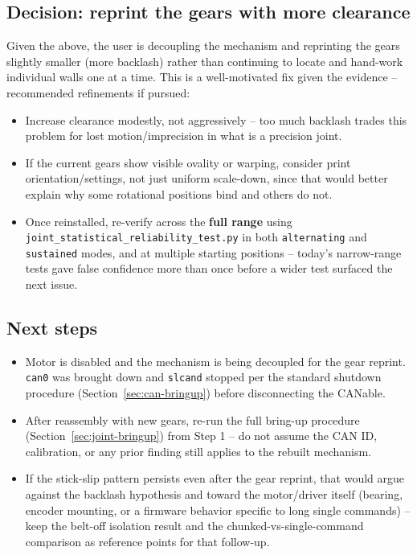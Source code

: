 \documentclass[11pt,letterpaper]{article}
\begin{document}
\subsection{Decision: reprint the gears with more clearance}
Given the above, the user is decoupling the mechanism and reprinting the gears slightly smaller (more backlash) rather than continuing to locate and hand-work individual walls one at a time. This is a well-motivated fix given the evidence -- recommended refinements if pursued:
\begin{itemize}
    \item Increase clearance modestly, not aggressively -- too much backlash trades this problem for lost motion/imprecision in what is a precision joint.
    \item If the current gears show visible ovality or warping, consider print orientation/settings, not just uniform scale-down, since that would better explain why some rotational positions bind and others do not.
    \item Once reinstalled, re-verify across the \textbf{full range} using \texttt{joint\_statistical\_reliability\_test.py} in both \texttt{alternating} and \texttt{sustained} modes, and at multiple starting positions -- today's narrow-range tests gave false confidence more than once before a wider test surfaced the next issue.
\end{itemize}

\subsection{Next steps}
\begin{itemize}
    \item Motor is disabled and the mechanism is being decoupled for the gear reprint. \texttt{can0} was brought down and \texttt{slcand} stopped per the standard shutdown procedure (Section~\ref{sec:can-bringup}) before disconnecting the CANable.
    \item After reassembly with new gears, re-run the full bring-up procedure (Section~\ref{sec:joint-bringup}) from Step 1 -- do not assume the CAN ID, calibration, or any prior finding still applies to the rebuilt mechanism.
    \item If the stick-slip pattern persists even after the gear reprint, that would argue against the backlash hypothesis and toward the motor/driver itself (bearing, encoder mounting, or a firmware behavior specific to long single commands) -- keep the belt-off isolation result and the chunked-vs-single-command comparison as reference points for that follow-up.
\end{itemize}
\end{document}

